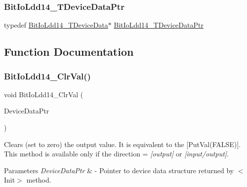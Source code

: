 \subsubsection{\texorpdfstring{Bit\+Io\+Ldd14\+\_\+\+T\+Device\+Data\+Ptr}{BitIoLdd14\_TDeviceDataPtr}}
{\footnotesize\ttfamily typedef \hyperlink{struct_bit_io_ldd14___t_device_data}{Bit\+Io\+Ldd14\+\_\+\+T\+Device\+Data}$\ast$ \hyperlink{group___bit_io_ldd14__module_ga2a6b33c565bd632d2d62a9d38a82ef55}{Bit\+Io\+Ldd14\+\_\+\+T\+Device\+Data\+Ptr}}



\subsection{Function Documentation}
\mbox{\label{group___bit_io_ldd14__module_ga3525e52f161a7a507fa5cbb80ddc5c60}} 
\subsubsection{\texorpdfstring{Bit\+Io\+Ldd14\+\_\+\+Clr\+Val()}{BitIoLdd14\_ClrVal()}}
{\footnotesize\ttfamily void Bit\+Io\+Ldd14\+\_\+\+Clr\+Val (\begin{DoxyParamCaption}\item[{\hyperlink{group___p_e___types__module_gac5cf1362f1f0e3a2ce71b1bf2276d091}{L\+D\+D\+\_\+\+T\+Device\+Data} $\ast$}]{Device\+Data\+Ptr }\end{DoxyParamCaption})}



Clears (set to zero) the output value. It is equivalent to the \mbox{[}Put\+Val(\+F\+A\+L\+S\+E)\mbox{]}. This method is available only if the direction = {\itshape \mbox{[}output\mbox{]}} or {\itshape \mbox{[}input/output\mbox{]}}. 


\begin{DoxyParams}{Parameters}
{\em Device\+Data\+Ptr} & -\/ Pointer to device data structure returned by $<$\+Init$>$ method. \\
\hline
\end{DoxyParams}
\mbox{\label{group___bit_io_ldd14__module_gaafad119c3f5eaac56fbe423465ad25de}} 
